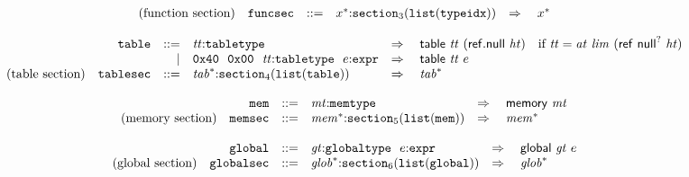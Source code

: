 \vspace{1ex}

$$
\begin{array}[t]{@{}lrrl@{}l@{}l@{}l@{}}
\mbox{(function section)} & {\mathtt{funcsec}} & ::= & {x^\ast}{:}{{\mathtt{section}}}_{3}({\mathtt{list}}({\mathtt{typeidx}})) & \quad\Rightarrow\quad{} & {x^\ast} \\
\end{array}
$$

\vspace{1ex}

$$
\begin{array}[t]{@{}lrrl@{}l@{}l@{}l@{}}
& {\mathtt{table}} & ::= & {\mathit{tt}}{:}{\mathtt{tabletype}} & \quad\Rightarrow\quad{} & \mathsf{table}~{\mathit{tt}}~(\mathsf{ref{.}null}~{\mathit{ht}}) & \quad \mbox{if}~ {\mathit{tt}} = {\mathit{at}}~{\mathit{lim}}~(\mathsf{ref}~{\mathsf{null}^?}~{\mathit{ht}}) \\
& & | & \mathtt{0x40}~~\mathtt{0x00}~~{\mathit{tt}}{:}{\mathtt{tabletype}}~~e{:}{\mathtt{expr}} & \quad\Rightarrow\quad{} & \mathsf{table}~{\mathit{tt}}~e \\
\mbox{(table section)} & {\mathtt{tablesec}} & ::= & {{\mathit{tab}}^\ast}{:}{{\mathtt{section}}}_{4}({\mathtt{list}}({\mathtt{table}})) & \quad\Rightarrow\quad{} & {{\mathit{tab}}^\ast} \\
\end{array}
$$

\vspace{1ex}

$$
\begin{array}[t]{@{}lrrl@{}l@{}l@{}l@{}}
& {\mathtt{mem}} & ::= & {\mathit{mt}}{:}{\mathtt{memtype}} & \quad\Rightarrow\quad{} & \mathsf{memory}~{\mathit{mt}} \\
\mbox{(memory section)} & {\mathtt{memsec}} & ::= & {{\mathit{mem}}^\ast}{:}{{\mathtt{section}}}_{5}({\mathtt{list}}({\mathtt{mem}})) & \quad\Rightarrow\quad{} & {{\mathit{mem}}^\ast} \\
\end{array}
$$

\vspace{1ex}

$$
\begin{array}[t]{@{}lrrl@{}l@{}l@{}l@{}}
& {\mathtt{global}} & ::= & {\mathit{gt}}{:}{\mathtt{globaltype}}~~e{:}{\mathtt{expr}} & \quad\Rightarrow\quad{} & \mathsf{global}~{\mathit{gt}}~e \\
\mbox{(global section)} & {\mathtt{globalsec}} & ::= & {{\mathit{glob}}^\ast}{:}{{\mathtt{section}}}_{6}({\mathtt{list}}({\mathtt{global}})) & \quad\Rightarrow\quad{} & {{\mathit{glob}}^\ast} \\
\end{array}
$$

